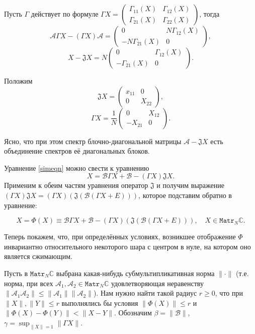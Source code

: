Пусть \( \Gamma \) действует по формуле
\( \Gamma X = \begin{pmatrix} \Gamma_{11}(X) & \Gamma_{12}(X) \\
                              \Gamma_{21}(X) & \Gamma_{22}(X)
                              \end{pmatrix} \), тогда
\[
    \mathcal{A} \Gamma X - (\Gamma X)\mathcal{A} = 
    \begin{pmatrix} 0 & N\Gamma_{12}(X) \\
        - N\Gamma_{21}(X) & 0
        \end{pmatrix}, \]
\[
    X - \mathfrak{J} X =
    N \begin{pmatrix} 0 & \Gamma_{12}(X) \\
        - \Gamma_{21}(X) & 0
        \end{pmatrix}.
    \]

Положим
\[
    \mathfrak{J} X = \begin{pmatrix} x_{11} & 0 \\ 0 & X_{22} \end{pmatrix}, \]
\[
    \mathfrak{\Gamma} X = \frac{1}{N}\begin{pmatrix} 0 & X_{12} \\ -X_{21} & 0 \end{pmatrix}. \]

Ясно, что при этом спектр блочно-диагональной матрицы \( \mathcal{A} - \mathfrak{J}X \)
есть объединение спектров её диагональных блоков.

Уравнение \eqref{simeqn} можно свести к уравнению
\[ X = \mathcal{B} \Gamma X + \mathcal{B} - (\Gamma X) \mathfrak{J} X. \]
Применим к обеим частям уравнения оператор \( \mathfrak{J} \) и получим выражение
 \( (\Gamma X) \mathfrak{J} X = (\Gamma X)(\mathfrak{J}(\mathcal{B} (\Gamma X + E))) \),
 которое подставим обратно в уравнение:

\begin{equation}\label{fixptneqn}
    X = \Phi(X) \equiv \mathcal{B} \Gamma X + \mathcal{B} - (\Gamma X)(\mathfrak{J}(\mathcal{B} (\Gamma X + E))), \quad X\in\mathtt{Matr}_N\mathbb{C}.
\end{equation}

Теперь покажем, что, при определённых условиях,
возникшее отображение \( \Phi \) инвариантно
относительного некоторого шара с центром в нуле,
на котором оно является сжимающим.

Пусть в \( \mathtt{Matr}_N\mathbb{C} \)
выбрана какая-нибудь субмультипликативная норма \( \|\cdot\| \)
(т.е. норма, при всех \( \mathcal{A}_1, \mathcal{A}_2 \in \mathtt{Matr}_N\mathbb{C} \)
 удовлетворяющая неравенству
 \( \| \mathcal{A}_1\mathcal{A}_2 \| \leq \|\mathcal{A}_1\|\|\mathcal{A}_2\| \)).
Нам нужно найти такой радиус \( r \geq 0 \),
что при \( \|X\|,\|Y\| \leq r \) выполнялись бы условия \( \|\Phi(X)\| \leq r \)
и \( \|\Phi(X) - \Phi(Y)\| < \|X-Y\| \).
Обозначим
\( \beta = \|\mathcal{B}\| \), \( \gamma = \sup_{\|X\|=1} \|\Gamma X\| \).

